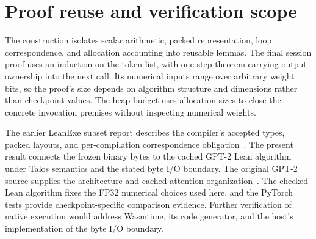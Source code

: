 \documentclass[11pt]{article}
\begin{document}
\section{Proof reuse and verification scope}

The construction isolates scalar arithmetic, packed representation, loop correspondence, and allocation accounting into reusable lemmas.  The final session proof uses an induction on the token list, with one step theorem carrying output ownership into the next call.  Its numerical inputs range over arbitrary weight bits, so the proof's size depends on algorithm structure and dimensions rather than checkpoint values.  The heap budget uses allocation sizes to close the concrete invocation premises without inspecting numerical weights.

The earlier LeanExe subset report describes the compiler's accepted types, packed layouts, and per-compilation correspondence obligation~\cite{subset}.  The present result connects the frozen binary bytes to the cached GPT-2 Lean algorithm under Talos semantics and the stated byte I/O boundary.  The original GPT-2 source supplies the architecture and cached-attention organization~\cite{gpt2}.  The checked Lean algorithm fixes the FP32 numerical choices used here, and the PyTorch tests provide checkpoint-specific comparison evidence.  Further verification of native execution would address Wasmtime, its code generator, and the host's implementation of the byte I/O boundary.
\end{document}
